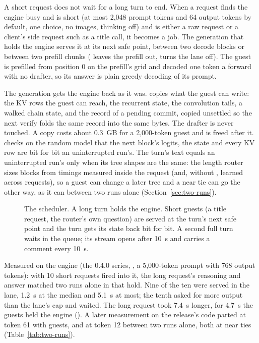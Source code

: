 A short request does not wait for a long turn to end. When a request finds the engine busy and is short (at most 2,048 prompt tokens and 64 output tokens by default, one choice, no images, thinking off) and is either a raw request or a client's side request such as a title call, it becomes a job. The generation that holds the engine serves it at its next safe point, between two decode blocks or between two prefill chunks ( leaves the prefill out,  turns the lane off). The guest is prefilled from position 0 on the prefill's grid and decoded one token a forward with no drafter, so its answer is plain greedy decoding of its prompt.

The generation gets the engine back as it was.   copies what the guest can write: the KV rows the guest can reach, the recurrent state, the convolution tails, a walked chain state, and the record of a pending commit, copied unsettled so the next verify folds the same record into the same bytes. The drafter is never touched. A copy costs about 0.3~GB for a 2,000-token guest and is freed after it.  checks on the random model that the next block's logits, the state and every KV row are bit for bit an uninterrupted run's. The turn's text equals an uninterrupted run's only when its tree shapes are the same: the length router sizes blocks from timings measured inside the request (and, without , learned across requests), so a guest can change a later tree and a near tie can go the other way, as it can between two runs alone (Section~\ref{sec:two-runs}).

\begin{figure}[htbp]
\centering

\caption[The scheduler: side lane and queue]{The scheduler. A long turn holds the engine. Short guests (a title request, the router's own question) are served at the turn's next safe point and the turn gets its state back bit for bit. A second full turn waits in the queue; its stream opens after 10~s and carries a comment every 10~s.}\label{fig:side-lane}
\end{figure}

Measured on the engine (the 0.4.0 series, , a 5,000-token prompt with 768 output tokens): with 10 short requests fired into it, the long request's reasoning and answer matched two runs alone in that hold. Nine of the ten were served in the lane, 1.2~s at the median and 5.1~s at most; the tenth asked for more output than the lane's cap and waited. The long request took 7.4~s longer, for 4.7~s the guests held the engine (\measured). A later measurement on the release's code parted at token 61 with guests, and at token 12 between two runs alone, both at near ties (Table~\ref{tab:two-runs}).

